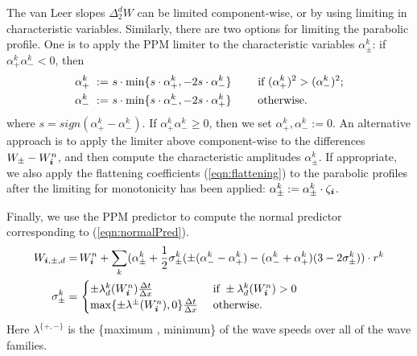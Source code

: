 The van Leer slopes $\Delta^d_2 W$ can be limited component-wise, or 
by using limiting in characteristic variables. Similarly, 
there are two options for limiting the parabolic profile. One is
to apply the PPM limiter to the characteristic variables $\alpha^k_\pm$: if 
$\alpha^k_+ \alpha^k_- < 0$, then
\begin{alignat*}{2}
\alpha^k_+ ~:=~ &
    s \cdot \min \{ s \cdot \alpha^k_+, -2 s \cdot \alpha^k_- \} &
    & ~~~ \hbox{ if } (\alpha^k_+)^2 > (\alpha^k_-)^2 ; \\
\alpha^k_- ~:=~ &
    s \cdot \min \{ s \cdot \alpha^k_-, -2 s \cdot \alpha^k_+ \} &
    & ~~~ \hbox{ otherwise. } 
\end{alignat*}
where $s = sign(\alpha^k_+ - \alpha^k_-)$. If $\alpha^k_+ \alpha^k_- \geq
0$, then we set $\alpha^k_+ , \alpha^k_- := 0$. An alternative approach is to
apply the limiter above component-wise to the differences 
$W_\pm - W^n_{\boldsymbol{i}}$, and then compute the characteristic
amplitudes $\alpha^k_\pm$. If appropriate, we also apply the flattening
coefficients (\ref{eqn:flattening}) to the parabolic profiles after the
limiting for monotonicity has been applied:
$\alpha^k_\pm := \alpha^k_\pm \cdot \zeta_{\boldsymbol{i}}$.

Finally, we use the PPM predictor to compute the normal predictor
corresponding to (\ref{eqn:normalPred}).
\begin{align*}
W_{{\boldsymbol{i}}, \pm, d} = \, &
    W^n_{{\boldsymbol{i}}} + \sum_k (\alpha^k_\pm + \frac{1}{2} \sigma^k_{\pm} 
    (\pm (\alpha^k_{-} - \alpha^k_{+}) - (\alpha^k_{-} + \alpha^k_{+})
    (3 - 2 \sigma^k_\pm)) \cdot r^k \\
\sigma^k_\pm = \, &
  \begin{cases}
    \pm \lambda^k_d(W^n_{{\boldsymbol{i}}}) \frac{\Delta t}{\Delta x}
    \space
  & \hbox{ if } \space \pm \lambda^k_d(W^n_{{\boldsymbol{i}}}) > 0 \\
    \max \{ \pm \lambda^{\pm}(W^n_{{\boldsymbol{i}}}), 0 \}
    \frac{\Delta t}{\Delta x}
  & \hbox{ otherwise. }
  \end{cases}
\end{align*}
Here $\lambda^{\{+,-\}}$ is the \{maximum , minimum\} of the wave speeds
over all of the wave families.


